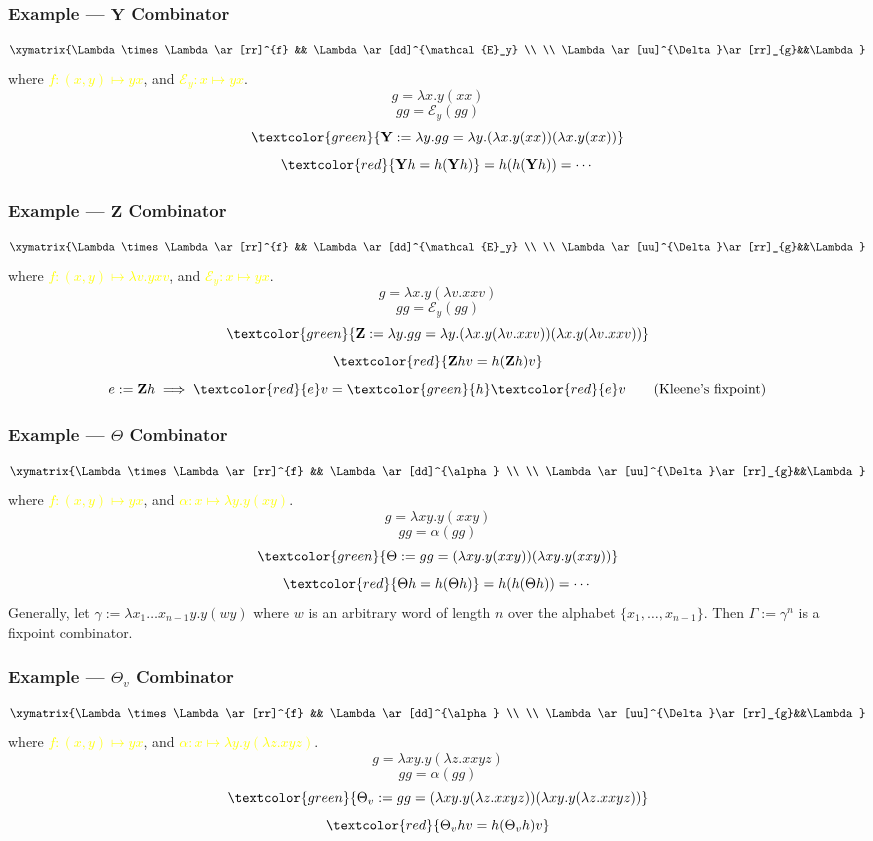 \documentclass[UTF8,aspectratio=43,11pt,colorlinks,compress,openany]{beamer}%
\begin{document}
\begin{frame}\frametitle{Example --- $\mathbf{Y}$ Combinator}
	\[\xymatrix{\Lambda\times \Lambda
		\ar[rr]^{f} && \Lambda \ar[dd]^{\mathcal{E}_y}
		\\
		\\
		\Lambda\ar[uu]^{\Delta}\ar[rr]_{g}&&\Lambda}\]
	where \textcolor{yellow}{$f:(x,y)\mapsto yx$}, and \textcolor{yellow}{$\mathcal{E}_y: x\mapsto yx$}.
	\[g=\lambda x.y(xx)\]
	\[gg=\mathcal{E}_y(gg)\]
	\[\textcolor{green}{\mathbf{Y}:=\lambda y.gg=\lambda y.(\lambda x.y(xx))(\lambda x.y(xx))}\]
	\[\textcolor{red}{\mathbf{Y}h=h(\mathbf{Y}h)}=h(h(\mathbf{Y}h))=\cdots\]
\end{frame}

\begin{frame}\frametitle{Example --- $\mathbf{Z}$ Combinator}
	\[\xymatrix{\Lambda\times \Lambda
		\ar[rr]^{f} && \Lambda \ar[dd]^{\mathcal{E}_y}
		\\
		\\
		\Lambda\ar[uu]^{\Delta}\ar[rr]_{g}&&\Lambda}\]
	where \textcolor{yellow}{$f:(x,y)\mapsto \lambda v.yxv$}, and \textcolor{yellow}{$\mathcal{E}_y: x\mapsto yx$}.
	\[g=\lambda x.y(\lambda v.xxv)\]
	\[gg=\mathcal{E}_y(gg)\]
	\[\textcolor{green}{\mathbf{Z}:=\lambda y.gg=\lambda y.(\lambda x.y(\lambda v.xxv))(\lambda x.y(\lambda v.xxv))}\]
	\[\textcolor{red}{\mathbf{Z}h v=h(\mathbf{Z}h)v}\]
	\[e:=\mathbf{Z}h\implies \textcolor{red}{e}v=\textcolor{green}{h}\textcolor{red}{e}v\tag{Kleene's fixpoint}\]
\end{frame}

\begin{frame}\frametitle{Example --- $\Theta$ Combinator}
	\[\xymatrix{\Lambda\times \Lambda
		\ar[rr]^{f} && \Lambda \ar[dd]^{\alpha}
		\\
		\\
		\Lambda\ar[uu]^{\Delta}\ar[rr]_{g}&&\Lambda}\]
	where \textcolor{yellow}{$f:(x,y)\mapsto yx$}, and \textcolor{yellow}{$\alpha: x\mapsto\lambda y.y(xy)$}.
	\[g=\lambda xy.y(xxy)\]
	\[gg=\alpha(gg)\]
	\[\textcolor{green}{\Theta:=gg=(\lambda xy.y(xxy))(\lambda xy.y(xxy))}\]
	\[\textcolor{red}{\Theta h=h(\Theta h)}=h(h(\Theta h))=\cdots\]
Generally, let $\gamma:=\lambda x_1\dots x_{n-1}y.y(wy)$ where $w$ is an arbitrary word of length $n$ over the alphabet $\{x_1,\dots, x_{n-1}\}$. Then $\Gamma:=\gamma^n$ is a fixpoint combinator.
\end{frame}

\begin{frame}\frametitle{Example --- $\Theta_v$ Combinator}
	\[\xymatrix{\Lambda\times \Lambda
		\ar[rr]^{f} && \Lambda \ar[dd]^{\alpha}
		\\
		\\
		\Lambda\ar[uu]^{\Delta}\ar[rr]_{g}&&\Lambda}\]
	where \textcolor{yellow}{$f:(x,y)\mapsto yx$}, and \textcolor{yellow}{$\alpha: x\mapsto\lambda y.y(\lambda z.xyz)$}.
	\[g=\lambda xy.y(\lambda z.xxyz)\]
	\[gg=\alpha(gg)\]
	\[\textcolor{green}{\Theta_v:=gg=(\lambda xy.y(\lambda z.xxyz))(\lambda xy.y(\lambda z.xxyz))}\]
	\[\textcolor{red}{\Theta_vhv=h(\Theta_vh)v}\]
\end{frame}
\end{document}
